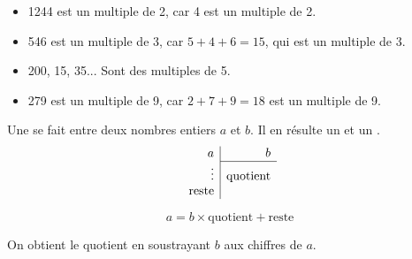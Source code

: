 \documentclass[../€Cours-complet/Cours-complet]{subfiles}
\begin{document}
\begin{exemple}
	\begin{itemize}
		\setlength\itemsep{0.3em}
		\item 1244 est un multiple de 2, car 4 est un multiple de 2.
		\item 546 est un multiple de 3, car $5 + 4 + 6 = 15$, qui est un multiple de 3.
		\item 200, 15, 35... Sont des multiples de 5.
		\item 279 est un multiple de 9, car $2 + 7 + 9 = 18$ est un multiple de 9.
	\end{itemize}
\end{exemple}

\begin{cours}
	Une  se fait entre deux nombres entiers $a$ et $b$. Il en résulte un  et un .
	$$
		\begin{array}{r|r}
			a            & b               \\
			\cline{2-2}
			\vdots       & \text{quotient} \\
			\text{reste} &
		\end{array}
	$$

	$$ a = b × \text{quotient} + \text{reste} $$

	On obtient le quotient en soustrayant $b$ aux chiffres de $a$.
\end{cours}
\end{document}
